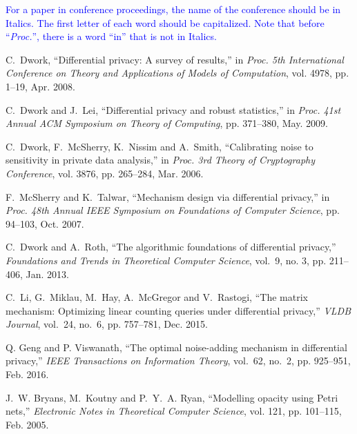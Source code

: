 \documentclass{article}
\begin{document}
\begin{thebibliography}{10}
			\begin{framed}	
		\textcolor{blue}{For a paper in conference proceedings, the name of the conference should be in Italics. The first letter of each word should be capitalized. Note that before ``\emph{Proc.}'', there is a word ``in'' that is not in Italics.}
		\end{framed}
		
		C.~Dwork, ``Differential privacy: A survey of results,'' in \emph{Proc. 5th International Conference on Theory and Applications of Models of Computation}, vol.
		4978, pp. 1--19, Apr. 2008.
		
		C.~Dwork and J.~Lei, ``Differential privacy and robust statistics,'' in
		\emph{Proc. 41st Annual ACM Symposium on Theory of Computing}, pp. 371--380, May. 2009.
		
		C.~Dwork, F.~McSherry, K.~Nissim and A.~Smith, ``Calibrating noise to
		sensitivity in private data analysis,'' in \emph{Proc. 3rd Theory of Cryptography Conference}, vol. 3876, pp. 265--284, Mar. 2006.
		
		F.~McSherry and K.~Talwar, ``Mechanism design via differential privacy,'' in
		\emph{Proc. 48th Annual IEEE Symposium on Foundations of Computer Science}, pp. 94--103, Oct. 2007.
		
		C.~Dwork and A.~Roth, ``The algorithmic foundations of differential privacy,''
		\emph{Foundations and Trends in Theoretical Computer Science}, vol.~9, no. 3, pp. 211--406, Jan. 2013.
		
		C.~Li, G.~Miklau, M.~Hay, A.~McGregor and V.~Rastogi, ``The matrix mechanism:
		Optimizing linear counting queries under differential privacy,'' \emph{VLDB
			Journal}, vol.~24, no.~6, pp. 757--781, Dec. 2015.
		
		Q. Geng and P. Viswanath, ``The optimal noise-adding mechanism in differential privacy,'' \emph{IEEE Transactions on Information Theory}, vol.~62, no.~2, pp. 925--951, Feb. 2016.
		
	
		

		
		J.~W. Bryans, M.~Koutny and P.~Y.~A. Ryan, ``Modelling opacity using Petri
		nets,'' \emph{Electronic Notes in Theoretical Computer Science}, vol. 121,
		pp. 101--115, Feb. 2005.
		
	
	

\end{thebibliography}
\end{document}

